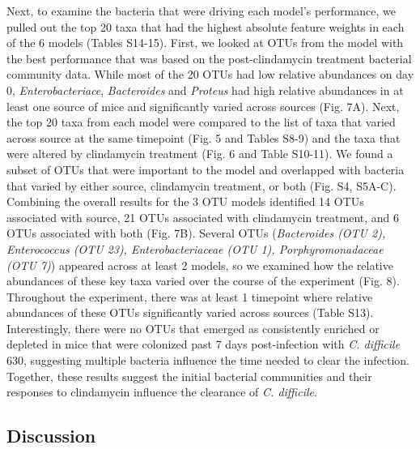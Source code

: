 \documentclass[11pt,]{article}
\begin{document}
Next, to examine the bacteria that were driving each model's
performance, we pulled out the top 20 taxa that had the highest absolute
feature weights in each of the 6 models (Tables S14-15). First, we
looked at OTUs from the model with the best performance that was based
on the post-clindamycin treatment bacterial community data. While most
of the 20 OTUs had low relative abundances on day 0,
\emph{Enterobacteriace}, \emph{Bacteroides} and \emph{Proteus} had high
relative abundances in at least one source of mice and significantly
varied across sources (Fig. 7A). Next, the top 20 taxa from each model
were compared to the list of taxa that varied across source at the same
timepoint (Fig. 5 and Tables S8-9) and the taxa that were altered by
clindamycin treatment (Fig. 6 and Table S10-11). We found a subset of
OTUs that were important to the model and overlapped with bacteria that
varied by either source, clindamycin treatment, or both (Fig. S4,
S5A-C). Combining the overall results for the 3 OTU models identified 14
OTUs associated with source, 21 OTUs associated with clindamycin
treatment, and 6 OTUs associated with both (Fig. 7B). Several OTUs
(\emph{Bacteroides (OTU 2), Enterococcus (OTU 23), Enterobacteriaceae
(OTU 1), Porphyromonadaceae (OTU 7)}) appeared across at least 2 models,
so we examined how the relative abundances of these key taxa varied over
the course of the experiment (Fig. 8). Throughout the experiment, there
was at least 1 timepoint where relative abundances of these OTUs
significantly varied across sources (Table S13). Interestingly, there
were no OTUs that emerged as consistently enriched or depleted in mice
that were colonized past 7 days post-infection with \emph{C. difficile}
630, suggesting multiple bacteria influence the time needed to clear the
infection. Together, these results suggest the initial bacterial
communities and their responses to clindamycin influence the clearance
of \emph{C. difficile}.

\subsection{Discussion}\label{discussion}
\end{document}
